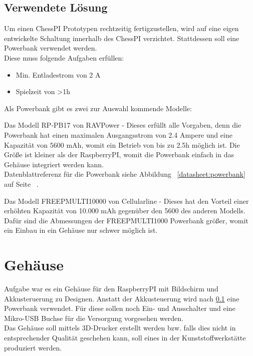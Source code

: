 \documentclass[12pt,a4paper]{article}
\begin{document}
{\newpage
\subsection{Verwendete Lösung}
\label{SUBSEC:POWERBANK}

Um einen ChessPI Prototypen rechtzeitig fertigzustellen, wird auf eine eigen entwickelte Schaltung innerhalb des ChessPI verzichtet. Stattdessen soll eine Powerbank verwendet werden. \\
Diese muss folgende Aufgaben erfüllen:
\begin{itemize}
	\item{Min. Entladestrom von 2 A}
	\item{Spielzeit von >1h}
\end{itemize}

Als Powerbank gibt es zwei zur Auswahl kommende Modelle:
\begin{itemize}
	\item{Das Modell RP-PB17 von RAVPower - Dieses erfüllt alle Vorgaben, denn die Powerbank hat einen maximalen Ausgangsstrom von 2.4 Ampere und eine Kapazität von 5600 mAh, womit ein Betrieb von bis zu 2.5h möglich ist. Die Größe ist kleiner als der RaspberryPI, womit die Powerbank einfach in das Gehäuse integriert werden kann. \\
Datenblattreferenz für die Powerbank siehe Abbildung ~\ref{datasheet:powerbank} auf Seite ~\pageref{datasheet:powerbank}.
	\item{Das Modell FREEPMULTI10000 von Cellularline - Dieses hat den Vorteil einer erhöhten Kapazität von 10.000 mAh gegenüber den 5600 des anderen Modells. Dafür sind die Abmessungen der FREEPMULTI1000 Powerbank größer, womit ein Einbau in ein Gehäuse nur schwer möglich ist.}
}
\end{itemize}

\clearpage\vfill\newpage{}
\section{Gehäuse}
\label{SEC:case}

Aufgabe war es ein Gehäuse für den RaspberryPI mit Bildschirm und Akkusteruerung zu Designen. Anstatt der Akkusteuerung wird nach \ref{SUBSEC:POWERBANK} eine Powerbank verwendet. Für diese sollen noch Ein- und Ausschalter und eine Mikro-USB Buchse für die Versorgung vorgesehen werden. \\
Das Gehäuse soll mittels 3D-Drucker erstellt werden bzw. falls dies nicht in entsprechender Qualität geschehen kann, soll eines in der Kunststoffwerkstätte produziert werden.\\

}
\end{document}
